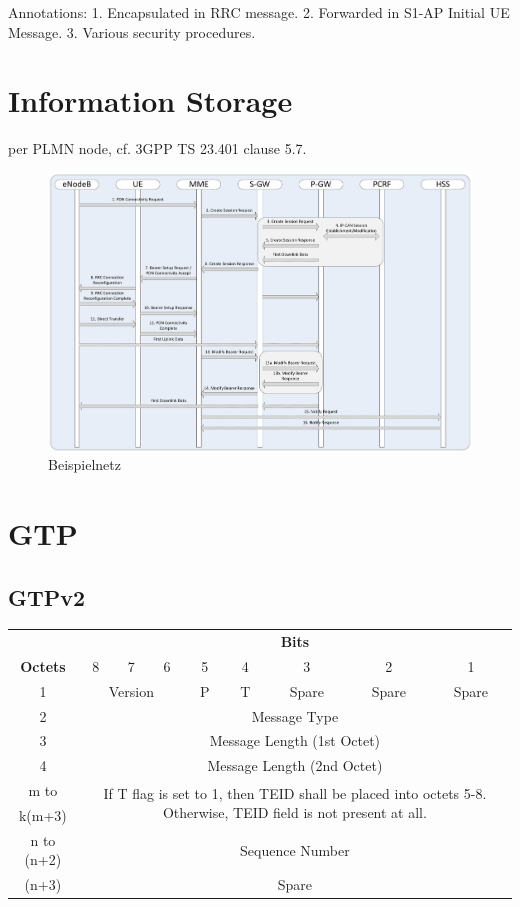 Annotations:
1. Encapsulated in RRC message.
2. Forwarded in S1-AP Initial UE Message.
3. Various security procedures.


\section{Information Storage}
per PLMN node, cf. 3GPP TS 23.401 clause 5.7.

\begin{figure}[htbp]
 \centering
 \includegraphics[width=1.0\textwidth]{images/3gpp/UE-requested-PDN-connectivity.pdf}
 \caption{Beispielnetz}\label{fig:3gpp-uepdnreq}
\end{figure}


\section{GTP}
\subsection{GTPv2}



\begin{tabular}{c|c|c|c|c|c|c|c|c|}
\multicolumn{1}{c}{} & \multicolumn{8}{c}{\textbf{Bits}} \\
\cline{2-9} \textbf{Octets} & 8 & 7 & 6 & 5 & 4 & 3 & 2 & 1 \\ 
\cline{2-9} 1 & \multicolumn{3}{c|}{Version}  & P & T & Spare & Spare & Spare \\ 
\cline{2-9} 2 & \multicolumn{8}{c|}{Message Type}  \\ 
\cline{2-9} 3 & \multicolumn{8}{c|}{Message Length (1st Octet)}  \\ 
\cline{2-9} 4 & \multicolumn{8}{c|}{Message Length (2nd Octet)}  \\ 
\cline{2-9} m to & \multicolumn{8}{c|}{\multirow{2}{10cm}{If T flag is set to 1, then TEID shall be placed into octets 5-8. Otherwise, TEID field is not present at all.}} \\ 
 k(m+3) & \multicolumn{8}{c|}{} \\ 
\cline{2-9} n to (n+2) & \multicolumn{8}{c|}{Sequence Number} \\ 
\cline{2-9} (n+3) & \multicolumn{8}{c|}{Spare} \\ 
\cline{2-9} 
\end{tabular} 
